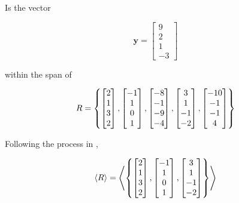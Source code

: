 \documentclass[a4paper,12pt]{article}
\begin{document}
\begin{exm}
  Is the vector

  $$\mathbf{y}=\begin{bmatrix}
    9\\
    2\\
    1\\
    -3
  \end{bmatrix}$$\s

  within the span of

  $$R=\left\{ \begin{bmatrix}
    2\\
    1\\
    3\\
    2
  \end{bmatrix},\begin{bmatrix}
    -1\\
    1\\
    0\\
    1
  \end{bmatrix},\begin{bmatrix}
    -8\\
    -1\\
    -9\\
    -4
  \end{bmatrix},\begin{bmatrix}
    3\\
    1\\
    -1\\
    -2
  \end{bmatrix},\begin{bmatrix}
    -10\\
    -1\\
    -1\\
    4
  \end{bmatrix}\right\}$$\s

  \ans Following the process in \rexm[\sctd{1}],

  $$\left\langle R\right\rangle=\left\langle \left\{ \begin{bmatrix}
    2\\
    1\\
    3\\
    2
  \end{bmatrix},\begin{bmatrix}
    -1\\
    1\\
    0\\
    1
  \end{bmatrix},\begin{bmatrix}
    3\\
    1\\
    -1\\
    -2
  \end{bmatrix}\right\}\right\rangle$$\s


\end{exm}
\end{document}
